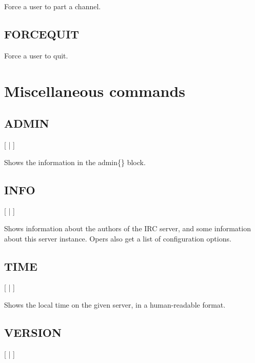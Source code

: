            Force a user to part a channel.



\subsection{FORCEQUIT}

     

           Force a user to quit.



\section{Miscellaneous commands}
\label{misccommands}

\subsection{ADMIN}

    [ | ]

	Shows the information in the admin\{\} block.


\subsection{INFO}

    [ | ]

	Shows information about the authors of the IRC server, and
	some information about this server instance.
	Opers also get a list of configuration options.


\subsection{TIME}

    [ | ]

	Shows the local time on the given server, in a human-{}readable format.


\subsection{VERSION}

    [ | ]

